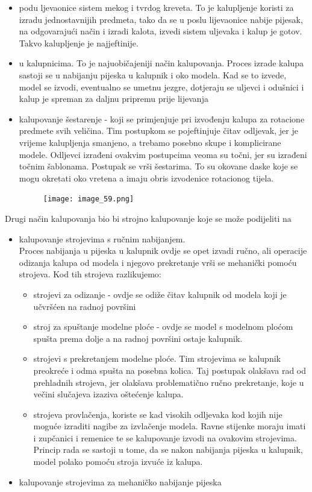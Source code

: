\documentclass[a4paper,12pt]{article}
\numberwithin{figure}{section}
\begin{document}
\begin{itemize}
\item podu ljevaonice sistem mekog i tvrdog kreveta. To je kalupljenje koristi za izradu jednostavnijih predmeta, tako da se u poslu lijevaonice nabije pijesak, na odgovarajući način i izradi kalota, izvedi sistem uljevaka i kalup je gotov. Takvo kalupljenje je najjeftinije.
\item u kalupnicima. To je najuobičajeniji način kalupovanja. Proces izrade kalupa sastoji se u nabijanju pijeska u kalupnik i oko modela. Kad se to izvede, model se izvodi, eventualno se umetnu jezgre, dotjeraju se uljevci i odušnici i kalup je spreman za daljnu pripremu prije lijevanja
\item kalupovanje šestarenje - koji se primjenjuje pri izvođenju kalupa za rotacione predmete svih veličina. Tim postupkom se pojeftinjuje čitav odljevak, jer je vrijeme kalupljenja smanjeno, a trebamo posebno skupe i komplicirane modele. Odljevci izrađeni ovakvim postupcima veoma su točni, jer su izrađeni točnim šablonama. Postupak se vrši šestarima. To su okovane daske koje se mogu okretati oko vretena a imaju obris izvodenice rotacionog tijela.
\begin{figure}[!h]
\centering
\texttt{[image: image\_59.png]}
\end{figure}
\FloatBarrier
\end{itemize}
Drugi način kalupovanja bio bi strojno kalupovanje koje se može podijeliti na
\begin{itemize}
\item kalupovanje strojevima s ručnim nabijanjem.\\
Proces nabijanja u pijeska u kalupnik ovdje se opet izvadi ručno, ali operacije odizanja kalupa od modela i njegovo prekretanje vrši se mehanički pomoću strojeva. Kod tih strojeva razlikujemo:
\begin{itemize}
\item strojevi za odizanje - ovdje se odiže čitav kalupnik od modela koji je učvršćen na radnoj površini
\item stroj za spuštanje modelne ploće - ovdje se model s modelnom ploćom spušta prema dolje a na radnoj površini ostaje kalupnik.
\item strojevi s prekretanjem modelne ploće. Tim strojevima se kalupnik preokreće i odma spušta na posebna kolica. Taj postupak olakšava rad od prehladnih strojeva, jer olakšava problematično ručno prekretanje, koje u večini slučajeva izaziva oštećenje kalupa.
\item strojeva provlačenja, koriste se kad visokih odljevaka kod kojih nije moguće izraditi nagibe za izvlačenje modela. Ravne stijenke moraju imati i zupčanici i remenice te se kalupovanje izvodi na ovakovim strojevima. Princip rada se sastoji u tome, da se nakon nabijanja pijeska u kalupnik, model polako pomoću stroja izvuće iz kalupa.
\end{itemize}
\item kalupovanje strojevima za mehaničko nabijanje pijeska
\end{itemize}
\end{document}

